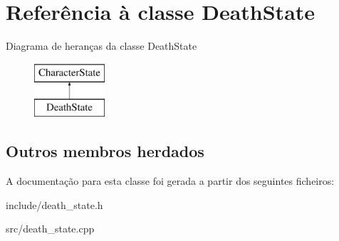 \hypertarget{classDeathState}{}\section{Referência à classe Death\+State}
\label{classDeathState}
Diagrama de heranças da classe Death\+State\begin{figure}[H]
\begin{center}
\leavevmode
\includegraphics[height=2.000000cm]{classDeathState}
\end{center}
\end{figure}
\subsection*{Outros membros herdados}


A documentação para esta classe foi gerada a partir dos seguintes ficheiros\+:\begin{DoxyCompactItemize}
\item 
include/death\+\_\+state.\+h\item 
src/death\+\_\+state.\+cpp\end{DoxyCompactItemize}
